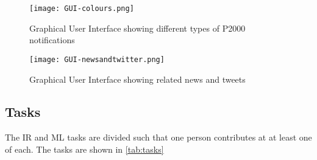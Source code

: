 \begin{center}
\begin{figure}[h!]
  \texttt{[image: GUI-colours.png]}
  \caption{Graphical User Interface showing different types of P2000 notifications}
  \label{fig:GUI-colours}
\end{figure}

\begin{figure}[h!]
  \texttt{[image: GUI-newsandtwitter.png]}
  \caption{Graphical User Interface showing related news and tweets}
  \label{fig:GUI-newsandtwitter}
\end{figure}
\end{center}

\subsection*{Tasks}
The IR and ML tasks are divided such that one person contributes at at least one of each. The tasks are shown in \autoref{tab:tasks}

